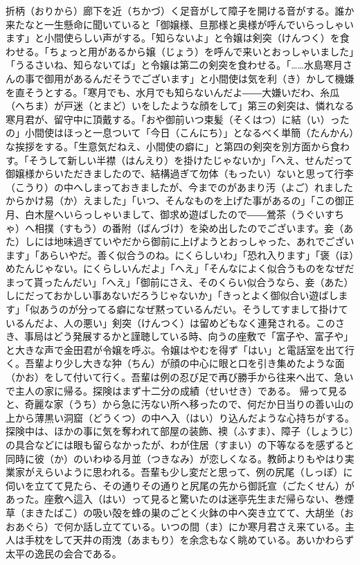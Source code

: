 \documentclass{book}
\begin{document}
折柄（おりから）廊下を近（ちかづ）く足音がして障子を開ける音がする。誰か来たなと一生懸命に聞いていると「御嬢様、旦那様と奥様が呼んでいらっしゃいます」と小間使らしい声がする。「知らないよ」と令嬢は剣突（けんつく）を食わせる。「ちょっと用があるから嬢（じょう）を呼んで来いとおっしゃいました」「うるさいね、知らないてば」と令嬢は第二の剣突を食わせる。「\ldots{}\ldots{}水島寒月さんの事で御用があるんだそうでございます」と小間使は気を利（き）かして機嫌を直そうとする。「寒月でも、水月でも知らないんだよ――大嫌いだわ、糸瓜（へちま）が戸迷（とまど）いをしたような顔をして」第三の剣突は、憐れなる寒月君が、留守中に頂戴する。「おや御前いつ束髪（そくはつ）に結（い）ったの」小間使はほっと一息ついて「今日（こんにち）」となるべく単簡（たんかん）な挨拶をする。「生意気だねえ、小間使の癖に」と第四の剣突を別方面から食わす。「そうして新しい半襟（はんえり）を掛けたじゃないか」「へえ、せんだって御嬢様からいただきましたので、結構過ぎて勿体（もったい）ないと思って行李（こうり）の中へしまっておきましたが、今までのがあまり汚（よご）れましたからかけ易（か）えました」「いつ、そんなものを上げた事があるの」「この御正月、白木屋へいらっしゃいまして、御求め遊ばしたので――鶯茶（うぐいすちゃ）へ相撲（すもう）の番附（ばんづけ）を染め出したのでございます。妾（あた）しには地味過ぎていやだから御前に上げようとおっしゃった、あれでございます」「あらいやだ。善く似合うのね。にくらしいわ」「恐れ入ります」「褒（ほ）めたんじゃない。にくらしいんだよ」「へえ」「そんなによく似合うものをなぜだまって貰ったんだい」「へえ」「御前にさえ、そのくらい似合うなら、妾（あた）しにだっておかしい事あないだろうじゃないか」「きっとよく御似合い遊ばします」「似あうのが分ってる癖になぜ黙っているんだい。そうしてすまして掛けているんだよ、人の悪い」剣突（けんつく）は留めどもなく連発される。このさき、事局はどう発展するかと謹聴している時、向うの座敷で「富子や、富子や」と大きな声で金田君が令嬢を呼ぶ。令嬢はやむを得ず「はい」と電話室を出て行く。吾輩より少し大きな狆（ちん）が顔の中心に眼と口を引き集めたような面（かお）をして付いて行く。吾輩は例の忍び足で再び勝手から往来へ出て、急いで主人の家に帰る。探険はまず十二分の成績（せいせき）である。
帰って見ると、奇麗な家（うち）から急に汚ない所へ移ったので、何だか日当りの善い山の上から薄黒い洞窟（どうくつ）の中へ入（はい）り込んだような心持ちがする。探険中は、ほかの事に気を奪われて部屋の装飾、襖（ふすま）、障子（しょうじ）の具合などには眼も留らなかったが、わが住居（すまい）の下等なるを感ずると同時に彼（か）のいわゆる月並（つきなみ）が恋しくなる。教師よりもやはり実業家がえらいように思われる。吾輩も少し変だと思って、例の尻尾（しっぽ）に伺いを立てて見たら、その通りその通りと尻尾の先から御託宣（ごたくせん）があった。座敷へ這入（はい）って見ると驚いたのは迷亭先生まだ帰らない、巻煙草（まきたばこ）の吸い殻を蜂の巣のごとく火鉢の中へ突き立てて、大胡坐（おおあぐら）で何か話し立てている。いつの間（ま）にか寒月君さえ来ている。主人は手枕をして天井の雨洩（あまもり）を余念もなく眺めている。あいかわらず太平の逸民の会合である。
\end{document}
